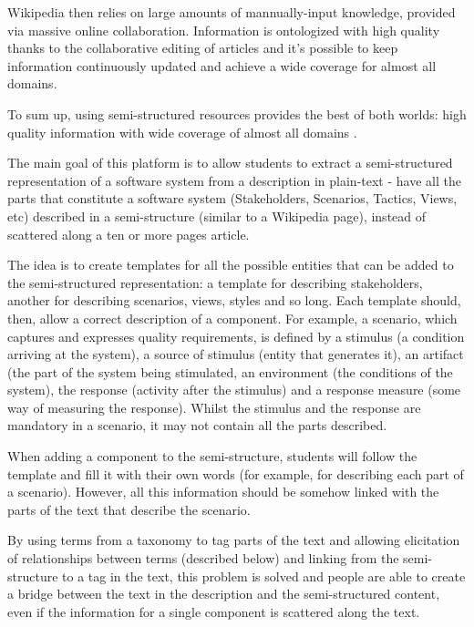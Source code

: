 Wikipedia then relies on large amounts of mannually-input knowledge, provided via massive online collaboration. Information is ontologized with high quality thanks to the collaborative editing of articles and it's possible to keep information continuously updated and achieve a wide coverage for almost all domains. 

To sum up, using semi-structured resources provides the best of both worlds: high quality information with wide coverage of almost all domains \cite{hovy2013collaboratively}.

The main goal of this platform is to allow students to extract a semi-structured representation of a software system from a description in plain-text - have all the parts that constitute a software system (Stakeholders, Scenarios, Tactics, Views, etc) described in a semi-structure (similar to a Wikipedia page), instead of scattered along a ten or more pages article. 

The idea is to create templates for all the possible entities that can be added to the semi-structured representation: a template for describing stakeholders, another for describing scenarios, views, styles and so long. Each template should, then, allow a correct description of a component. For example, a scenario, which captures and expresses quality requirements, is defined by a stimulus (a condition arriving at the system), a source of stimulus (entity that generates it), an artifact (the part of the system being stimulated, an environment (the conditions of the system), the response (activity after the stimulus) and a response measure (some way of measuring the response). Whilst the stimulus and the response are mandatory in a scenario, it may not contain all the parts described.

When adding a component to the semi-structure, students will follow the template and fill it with their own words (for example, for describing each part of a scenario). However, all this information should be somehow linked with the parts of the text that describe the scenario.

By using terms from a taxonomy to tag parts of the text and allowing elicitation of relationships between terms (described below) and linking from the semi-structure to a tag in the text, this problem is solved and people are able to create a bridge between the text in the description and the semi-structured content, even if the information for a single component is scattered along the text.  


